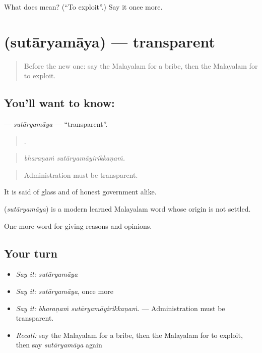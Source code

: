 \begin{tcolorbox}[breakable,colback=teal!4,colframe=teal!35!black,title={Before you move on}]
What does   mean? (\textquotedblleft{}To exploit\textquotedblright{}.) Say it once more.
\end{tcolorbox}
\section[\texorpdfstring{\ml{സുതാര്യമായ} (sutāryamāya)}{സുതാര്യമായ (sutāryamāya)}]{ (sutāryamāya) — transparent}

\label{lesson:ML-C430-sutaryamaya}



\begin{quote}
Before the new one: say the Malayalam for a bribe, then the Malayalam for to exploit.
\end{quote}

\subsection*{You'll want to know: }
\textbf{} — \emph{sutāryamāya} — \textquotedblleft{}transparent\textquotedblright{}.

\begin{quote}
 .
\end{quote}

\begin{quote}
\emph{bharaṇaṁ sutāryamāyirikkaṇaṁ.}
\end{quote}

\begin{quote}
Administration must be transparent.
\end{quote}

It is said of glass and of honest government alike.

\begin{cousinweb}
\textbf{} (\emph{sutāryamāya}) is a modern learned Malayalam word whose origin is not settled.
\end{cousinweb}

\begin{grammarlens}[title={What you've built}]
One more word for giving reasons and opinions.
\end{grammarlens}

\subsection*{Your turn}
\begin{itemize}
\raggedright
  \item \emph{Say it:} \emph{sutāryamāya}
  \item \emph{Say it:} \emph{sutāryamāya}, once more
  \item \emph{Say it:} \emph{bharaṇaṁ sutāryamāyirikkaṇaṁ.} — Administration must be transparent.
  \item \emph{Recall:} say the Malayalam for a bribe, then the Malayalam for to exploit, then say \emph{sutāryamāya} again
\end{itemize}

